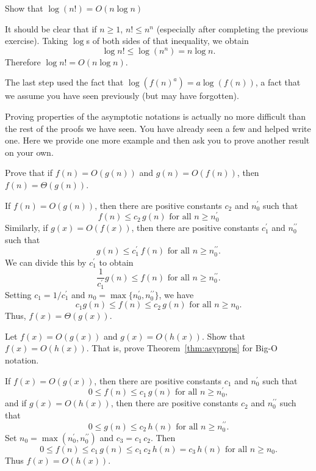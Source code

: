 \begin{exa}
Show that $\log (n!) = O(n\log n)$
\begin{pf}
It should be clear that if $n\geq 1$, $n!\leq n^n$ (especially after 
completing the previous exercise). 
Taking $\log$s of both sides of that inequality,
we obtain 
$$\log n!\leq \log (n^n) = n\log n.$$
Therefore $\log n! = O(n\log n)$.
\end{pf}
The last step used the fact that $\log (f(n)^a)=a\log (f(n))$, a fact that we assume you 
have seen previously (but may have forgotten).
\end{exa}


Proving properties of the asymptotic notations is actually no more difficult than the rest of
the proofs we have seen.  You have already seen a few and helped write one.  
Here we provide one more example and then ask you to prove another result on your own.

\begin{exa}
Prove that if $f(n)=O(g(n))$ and $g(n)=O(f(n))$, then
$f(n)=\Theta(g(n))$.
\begin{pf}
If $f(n)=O(g(n))$, 
then there are positive constants $c_2$ and $n_{0}^{\prime}$ such that 
$$f(n)\leq c_2\,g(n)\mbox{ for all }n \ge n_{0}^{\prime}$$
Similarly, if $g(x)=O(f(x))$, 
then there are positive constants $c_1^{\prime}$ and $n_{0}^{\prime\prime}$
such that 
$$g(n)\leq c_1^{\prime}\,f(n)\mbox{ for all }n 
\ge n_{0}^{\prime\prime}.$$
We can divide this by $c_1^{\prime}$ to obtain 
$$\frac{1}{c_1^{\prime}}g(n)\leq f(n)\mbox{ for all }n 
\ge n_{0}^{\prime\prime}.$$
Setting $c_1=1/c_1^{\prime}$ and 
$n_0=\max\{n_0^{\prime},n_0^{\prime\prime}\}$, 
we have 
$$c_1 g(n)\leq f(n)\leq c_2\,g(n)\mbox{ for all }n \ge n_{0}.$$
Thus, $f(x)=\Theta(g(x)).$
\end{pf}
\end{exa}

\begin{exer}\label{exer:bigoTranProof}
Let $f(x)=O(g(x))$ and $g(x)=O(h(x))$. Show that $f(x)=O(h(x))$.
That is, prove Theorem~\ref{thm:asyprops} for Big-O notation.

\vspace*{3.5in}
\begin{answer}
If $f(x)=O(g(x))$, 
then there are positive constants $c_1$ and $n_{0}^{\prime}$
such that 
$$0\leq f(n)\leq c_1\,g(n)\mbox{ for all }n \ge n_{0}^{\prime},$$
and if $g(x)=O(h(x))$, 
then there are positive constants $c_2$ and 
$n_{0}^{\prime\prime}$ such that 
$$0\leq g(n)\leq c_2\,h(n)\mbox{ for all }n \ge n_{0}^{\prime\prime}.$$
Set $n_0=\max(n_0^{\prime},n_0^{\prime\prime})$ and $c_3=c_1\,c_2$.
Then
$$0\leq f(n)\leq c_1\,g(n)\leq c_1\,c_2\,h(n)=c_3\,h(n) 
\mbox{ for all }n \ge n_{0}.$$
Thus $f(x)=O(h(x))$.
\end{answer}
\end{exer}

